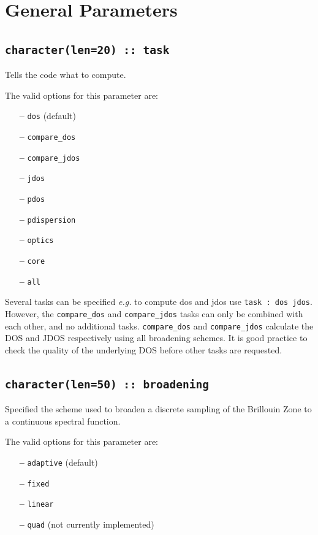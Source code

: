 \documentclass[a4paper,11pt,twoside]{book}
\begin{document}
{\clearpage


\section{General Parameters}
\subsection[task]{\tt character(len=20) :: task}

Tells the code what to compute.

The valid options for this parameter are:
\begin{itemize}
\item[{\bf --}]  \verb#dos# (default)
\item[{\bf --}]  \verb#compare_dos#
\item[{\bf --}]  \verb#compare_jdos#
\item[{\bf --}]  \verb#jdos#
\item[{\bf --}]  \verb#pdos#
\item[{\bf --}]  \verb#pdispersion#
\item[{\bf --}]  \verb#optics#
\item[{\bf --}]  \verb#core#
\item[{\bf --}]  \verb#all#
\end{itemize}
Several tasks can be specified \emph{e.g.} to compute dos and jdos use
\verb#task : dos jdos#.
However, the \verb#compare_dos# and \verb#compare_jdos# tasks can only be combined with each other, and no additional tasks.
\verb#compare_dos# and \verb#compare_jdos# calculate the DOS and JDOS respectively using all broadening schemes. It is good practice to check the quality of the underlying DOS before other tasks are requested.

\subsection[broadening]{\tt character(len=50) :: broadening}

Specified the scheme used to broaden a discrete sampling of the
Brillouin Zone to a continuous spectral function.

The valid options for this parameter are:
\begin{itemize}
\item[{\bf --}]  \verb#adaptive# (default)
\item[{\bf --}]  \verb#fixed#
\item[{\bf --}]  \verb#linear#
\item[{\bf --}]  \verb#quad# (not currently implemented)
\end{itemize}

}
\end{document}
